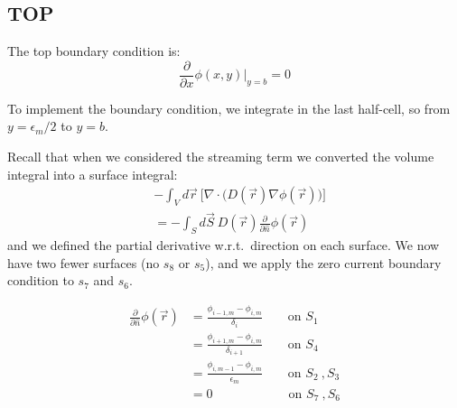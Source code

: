 \documentclass[12pt]{article}
\begin{document}
\subsection*{TOP}
The top boundary condition is:
\[\frac{\partial }{\partial x} \phi(x,y)\big|_{y=b} = 0\]


To implement the boundary condition, we integrate in the last half-cell, so from $y=\epsilon_m / 2$ to $y=b$. 

Recall that when we considered the streaming term we converted the volume integral into a surface integral: 
\begin{align}
&-\int_V d\vec{r}\:\bigl[\nabla \cdot \bigl(D(\vec{r})\nabla \phi(\vec{r})\bigr)\bigr] \nonumber \\
 &= -\int_S d\vec{S} \:D(\vec{r})\frac{\partial}{\partial \hat{n}}\phi(\vec{r}) \nonumber
\end{align}
%
and we defined the partial derivative w.r.t.\ direction on each surface. We now have two fewer surfaces (no $s_8$ or $s_5$), and we apply the zero current boundary condition to $s_7$ and $s_6$.


\begin{align}
\frac{\partial}{\partial \hat{n}}\phi(\vec{r}) &= \frac{\phi_{i-1,m} - \phi_{i,m}}{\delta_{i}} \qquad \text{on } S_1  \nonumber \\
%
&= \frac{\phi_{i+1,m} - \phi_{i,m}}{\delta_{i+1}} \qquad \text{on } S_4 \nonumber \\
%
&= \frac{\phi_{i,m-1} - \phi_{i,m}}{\epsilon_m} \qquad \text{on } S_2 \:, S_3 \nonumber \\
%
&= 0 \qquad \qquad \qquad \text{on } S_7 \:, S_6 \nonumber 
\end{align}
\end{document}
